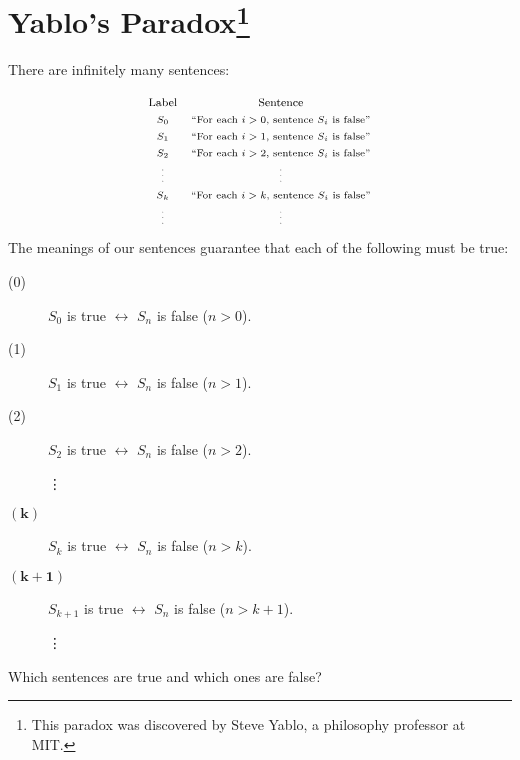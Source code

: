 \documentclass[12pt]{extarticle}
\begin{document}
\section{Yablo's Paradox\footnote{This paradox was discovered by Steve Yablo, a philosophy professor at MIT. 
} {\normalsize {}}}


There are infinitely many sentences:

\[
\begin{array}{cc}
\text{\footnotesize Label} & \text{\footnotesize Sentence} \\
 \text{\scriptsize $S_0$} & \text{\scriptsize ``For each \(i>0\), sentence \(S_i\) is false''} \\
\text{\scriptsize $S_1$} & \text{\scriptsize ``For each \(i>1\), sentence \(S_i\) is false''} \\
\text{\scriptsize $S_2$} & \text{\scriptsize ``For each \(i>2\), sentence \(S_i\) is false''} \\
\text{\tiny\vdots} & \text{\tiny\vdots}\\
\text{\scriptsize $S_k$} & \text{\scriptsize ``For each \(i>k\), sentence \(S_i\) is false''} \\
\text{\tiny\vdots} & \text{\tiny\vdots}\\
\end{array}
\]
The meanings of our sentences guarantee that each of the following must be true:

\begin{description}

\item[(0)] \(S_0\) is true $\leftrightarrow$ \(S_n\) is false (\(n>0\)).

\item[(1)] \(S_1\) is true $\leftrightarrow$ \(S_n\)  is false (\(n>1\)).

\item[(2)] \(S_2\) is true $\leftrightarrow$ \(S_n\) is false (\(n>2\)).

\hspace{5mm }\vdots

\item[$\bm{(k)}$] \(S_k\) is true $\leftrightarrow$ \(S_n\)  is false (\(n>k\)).
\item[$\bm{(k+1)}$] \(S_{k+1}\) is true $\leftrightarrow$ \(S_n\)  is false (\(n>k+1\)).

\hspace{5mm }\vdots


\end{description}
Which sentences are true and which ones are false?
\end{document}
